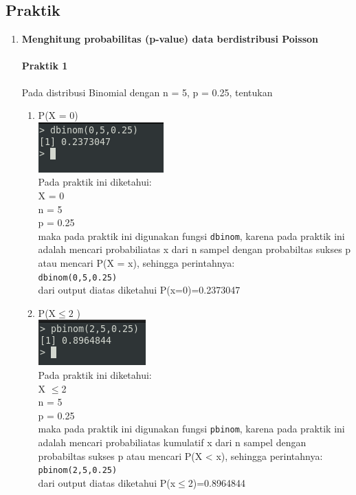\documentclass[a4paper,12pt]{article}
\begin{document}
\subsection{Praktik}
\begin{enumerate}[label=\textbf{\Alph*.}]
	
	\item \textbf{Menghitung probabilitas (p-value) data berdistribusi Poisson}
	\paragraph{Praktik 1\\}
	Pada distribusi Binomial dengan n = 5, p = 0.25, tentukan
	\begin{enumerate}[label=\alph*.]
		\item P(X = 0)\\
		\includegraphics[scale=1]{praka1a}\\
		Pada praktik ini diketahui:\\
		X = 0\\
		n = 5\\
		p = 0.25\\
		maka pada praktik ini digunakan fungsi \texttt{dbinom}, karena pada praktik ini adalah mencari probabiliatas x dari n sampel dengan
		probabiltas sukses p atau mencari P(X = x), sehingga perintahnya:\\
		\texttt{dbinom(0,5,0.25)}\\
		dari output diatas diketahui P(x=0)=0.2373047
		
		\item P(X$\leq2$ )\\
		\includegraphics[scale=1]{praka1b}\\
		Pada praktik ini diketahui:\\
		X $\leq$2\\
		n = 5\\
		p = 0.25\\
		maka pada praktik ini digunakan fungsi \texttt{pbinom}, karena pada praktik ini adalah mencari probabiliatas kumulatif x dari n sampel
		dengan probabiltas sukses p atau mencari P(X < x), sehingga perintahnya:\\
		\texttt{pbinom(2,5,0.25)}\\
		dari output diatas diketahui P(x$\leq$2)=0.8964844	
	\end{enumerate}

\end{enumerate}
\end{document}
